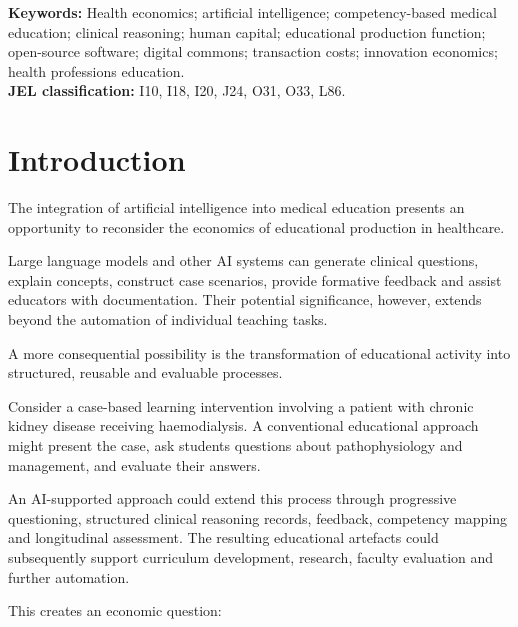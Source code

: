 \documentclass[11pt,a4paper]{article}
\begin{document}
\begin{abstract}
Conclusions: AI-assisted CBME should be evaluated not merely as a teaching technology but as a potentially scalable investment in clinical human capital and shared knowledge infrastructure. Its long-term economic value depends on whether it develops demonstrable clinical competence while generating reusable educational and technological assets. The distinction between harvesting existing resources and cultivating future productive capacity provides a useful framework for analysing the sustainability of AI-enabled medical education.
\end{abstract}
\noindent\textbf{Keywords:} Health economics; artificial intelligence; competency-based medical education; clinical reasoning; human capital; educational production function; open-source software; digital commons; transaction costs; innovation economics; health professions education.\\
\textbf{JEL classification:} I10, I18, I20, J24, O31, O33, L86.
\section{Introduction}
The integration of artificial intelligence into medical education presents an opportunity to reconsider the economics of educational production in healthcare.

Large language models and other AI systems can generate clinical questions, explain concepts, construct case scenarios, provide formative feedback and assist educators with documentation. Their potential significance, however, extends beyond the automation of individual teaching tasks.

A more consequential possibility is the transformation of educational activity into structured, reusable and evaluable processes.

Consider a case-based learning intervention involving a patient with chronic kidney disease receiving haemodialysis. A conventional educational approach might present the case, ask students questions about pathophysiology and management, and evaluate their answers.

An AI-supported approach could extend this process through progressive questioning, structured clinical reasoning records, feedback, competency mapping and longitudinal assessment. The resulting educational artefacts could subsequently support curriculum development, research, faculty evaluation and further automation.

This creates an economic question:
\end{document}
